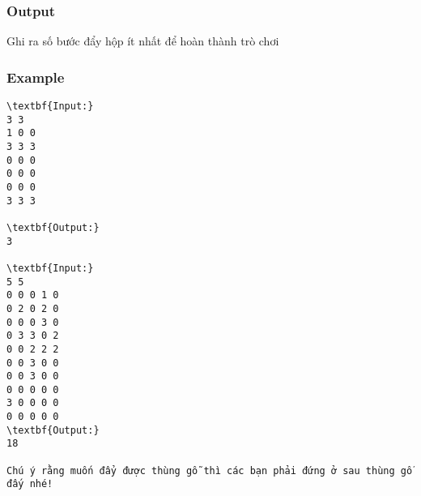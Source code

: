 \subsubsection{Output}

Ghi ra số bước đẩy hộp ít nhất để hoàn thành trò chơi

\subsubsection{Example}
\begin{verbatim}
\textbf{Input:}
3 3
1 0 0
3 3 3
0 0 0
0 0 0
0 0 0
3 3 3

\textbf{Output:}
3

\textbf{Input:}
5 5
0 0 0 1 0
0 2 0 2 0
0 0 0 3 0
0 3 3 0 2
0 0 2 2 2
0 0 3 0 0
0 0 3 0 0
0 0 0 0 0
3 0 0 0 0
0 0 0 0 0
\textbf{Output:}
18

Chú ý rằng muốn đẩy được thùng gỗ thì các bạn phải đứng ở sau thùng gỗ đấy nhé!
\end{verbatim}